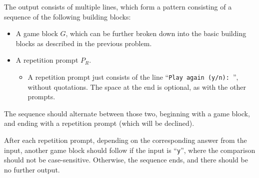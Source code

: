The output consists of multiple lines,
which form a pattern consisting of a sequence
of the following building blocks:
\begin{itemize}
    \item
    A game block $G$,
    which can be further broken down into the basic building blocks
    as described in the previous problem.
    \item
    A repetition prompt $P_R$.
    \begin{itemize}
        \item
        A repetition prompt just consists of the line
        ``\texttt{Play again (y/n): }'', without quotations.
        The space at the end is optional,
        as with the other prompts.
    \end{itemize}
\end{itemize}
The sequence should alternate between those two,
beginning with a game block, and ending with a repetition prompt
(which will be declined).

After each repetition prompt,
depending on the corresponding answer from the input,
another game block should follow if the input is ``\texttt{y}'',
where the comparison should not be case-sensitive.
Otherwise, the sequence ends, and there should be no further output.
